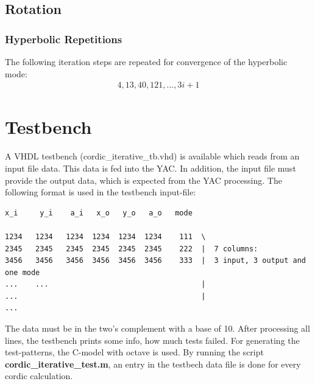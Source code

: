 \documentclass[a4paper, 12pt, notitlepage]{report}
\newcommand{\file}[1]{\textbf{#1}}
\begin{document}
   \subsection{Rotation}

   \subsubsection{Hyperbolic Repetitions}
   The following iteration steps are repeated for convergence of the hyperbolic mode:
   \begin{eqnarray}
      4, 13, 40, 121, ..., 3i+1
   \end{eqnarray}



\section{Testbench}
A VHDL testbench (cordic\_iterative\_tb.vhd) is available which reads from an input file
data. This data is fed into the YAC. In addition, the input file must
provide the output data, which is expected from the YAC processing.
The following format is used in the testbench input-file:
\begin{verbatim}
x_i     y_i    a_i   x_o   y_o   a_o   mode

1234   1234   1234  1234  1234  1234    111  \
2345   2345   2345  2345  2345  2345    222  |  7 columns:
3456   3456   3456  3456  3456  3456    333  |  3 input, 3 output and one mode
...    ...                                   |
...                                          |
...
\end{verbatim}
The data must be in the two's complement with a base of 10.
After processing all lines, the testbench prints some info, how much
tests failed.\newline
For generating the test-patterns, the C-model with octave is used. By running
the script \file{cordic\_iterative\_test.m}, an entry 
in the testbech data file is done for every cordic calculation.
\end{document}
